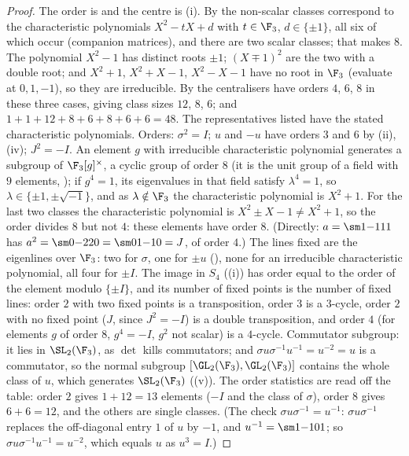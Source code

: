 \begin{proof}
The order is  and the centre is (i). By  the non-scalar classes correspond to the
characteristic polynomials $X^2-tX+d$ with $t\in\F_3$, $d\in\{\pm1\}$, all six of which occur (companion matrices), and there are two scalar classes; that makes
$8$. The polynomial $X^2-1$ has distinct roots $\pm1$; $(X\mp1)^2$ are the two with a double root; and $X^2+1$, $X^2+X-1$, $X^2-X-1$ have no root in $\F_3$
(evaluate at $0,1,-1$), so they are irreducible. By  the centralisers have orders $4$, $6$, $8$ in these three cases, giving class sizes
$12$, $8$, $6$; and $1+1+12+8+6+8+6+6=48$. The representatives listed have the stated characteristic polynomials. Orders: $\sigma^2=I$; $u$ and $-u$ have orders
$3$ and $6$ by (ii),(iv); $J^2=-I$. An element $g$ with irreducible characteristic polynomial generates a subgroup of
$\F_3[g]^\times$, a cyclic group of order $8$ (it is the unit group of a field with $9$ elements, ); if $g^4=1$, its eigenvalues in that field
satisfy $\lambda^4=1$, so $\lambda\in\{\pm1,\pm\sqrt{-1}\}$, and as $\lambda\notin\F_3$ the characteristic polynomial is $X^2+1$. For the last two classes the
characteristic polynomial is $X^2\pm X-1\ne X^2+1$, so the order divides $8$ but not $4$: these elements have order $8$. (Directly: $a=\sm1{-1}11$ has
$a^2=\sm0{-2}20=\sm01{-1}0=J$, of order $4$.) The lines fixed are the eigenlines over $\F_3$: two for $\sigma$, one for $\pm u$ (), none for an irreducible characteristic
polynomial, all four for $\pm I$. The image in $S_4$ ((i)) has order equal to the order of the element modulo $\{\pm I\}$, and its number of
fixed points is the number of fixed lines: order $2$ with two fixed points is a transposition, order $3$ is a $3$-cycle, order $2$ with no fixed point
($J$, since $J^2=-I$) is a double transposition, and order $4$ (for elements $g$ of order $8$, $g^4=-I$, $g^2$ not scalar) is a $4$-cycle. Commutator subgroup: it lies
in $\SL_2(\F_3)$, as $\det$ kills commutators; and $\sigma u\sigma^{-1}u^{-1}=u^{-2}=u$ is a commutator, so the normal subgroup $[\GL_2(\F_3),\GL_2(\F_3)]$ contains the
whole class of $u$, which generates $\SL_2(\F_3)$ ((v)). The order statistics are read off the table: order $2$ gives
$1+12=13$ elements ($-I$ and the class of $\sigma$), order $8$ gives $6+6=12$, and the others are single classes. (The check $\sigma u\sigma^{-1}=u^{-1}$: $\sigma u\sigma^{-1}$
replaces the off-diagonal entry $1$ of $u$ by $-1$, and $u^{-1}=\sm1{-1}01$; so $\sigma u\sigma^{-1}u^{-1}=u^{-2}$, which equals $u$ as $u^3=I$.)
\end{proof}

